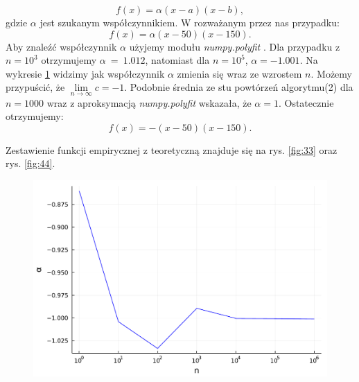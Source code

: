 \documentclass{article}
\theoremstyle{break}
\numberwithin{equation}{subsection}
\numberwithin{figure}{section}
\begin{document}
$$f(x)=\alpha(x-a)(x-b),$$
gdzie $\alpha$ jest szukanym współczynnikiem. W rozważanym przez nas przypadku:
$$f(x)=\alpha(x-50)(x-150).$$
Aby znaleźć współczynnik $\alpha$ użyjemy modułu \textit{numpy.polyfit} \cite{polyfit}. Dla przypadku z $n=10^3$ otrzymujemy $\alpha~=~1.012$, natomiast dla $n=10^5$, $\alpha=-1.001$. Na wykresie \ref{fig:a} widzimy jak współczynnik $\alpha$ zmienia się wraz ze wzrostem $n$. Możemy przypuścić, że $\lim\limits_{n\rightarrow\infty}c=-1$. Podobnie średnia ze stu powtórzeń algorytmu(2) dla $n=1000$ wraz z aproksymacją \textit{numpy.polyfit} wskazała, że $\alpha=1$. Ostatecznie otrzymujemy:
$$f(x)=-(x-50)(x-150).$$

Zestawienie funkcji empirycznej z teoretyczną znajduje się na rys. \ref{fig:33} oraz rys. \ref{fig:44}.
\begin{figure}
	\begin{center}
		\includegraphics[scale=0.30]{alpha.pdf}
		\caption{}
		\label{fig:a}
	\end{center}
\end{figure}
\end{document}
